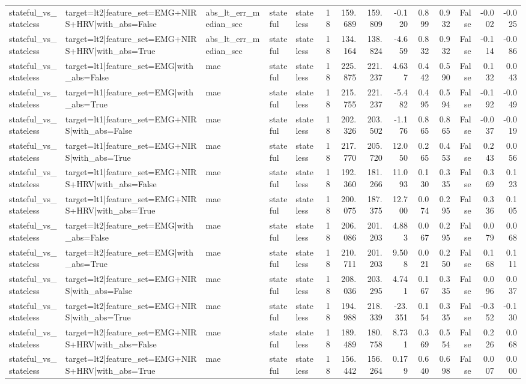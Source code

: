 \begin{table}
\begin{tabular}{lllllrrrrrrrrr}
stateful_vs_stateless & target=lt2|feature_set=EMG+NIRS+HRV|with_abs=False & abs_lt_err_median_sec & stateful & stateless & 18 & 159.689 & 159.809 & -0.120 & 0.899 & 0.932 & False & -0.002 & -0.025 \\
stateful_vs_stateless & target=lt2|feature_set=EMG+NIRS+HRV|with_abs=True & abs_lt_err_median_sec & stateful & stateless & 18 & 134.164 & 138.824 & -4.659 & 0.832 & 0.932 & False & -0.114 & -0.086 \\
stateful_vs_stateless & target=lt1|feature_set=EMG|with_abs=False & mae & stateful & stateless & 18 & 225.875 & 221.237 & 4.637 & 0.442 & 0.590 & False & 0.132 & 0.043 \\
stateful_vs_stateless & target=lt1|feature_set=EMG|with_abs=True & mae & stateful & stateless & 18 & 215.755 & 221.237 & -5.482 & 0.495 & 0.594 & False & -0.192 & -0.049 \\
stateful_vs_stateless & target=lt1|feature_set=EMG+NIRS|with_abs=False & mae & stateful & stateless & 18 & 202.326 & 203.502 & -1.176 & 0.865 & 0.865 & False & -0.037 & -0.019 \\
stateful_vs_stateless & target=lt1|feature_set=EMG+NIRS|with_abs=True & mae & stateful & stateless & 18 & 217.770 & 205.720 & 12.050 & 0.265 & 0.453 & False & 0.243 & 0.056 \\
stateful_vs_stateless & target=lt1|feature_set=EMG+NIRS+HRV|with_abs=False & mae & stateful & stateless & 18 & 192.360 & 181.266 & 11.093 & 0.130 & 0.335 & False & 0.369 & 0.123 \\
stateful_vs_stateless & target=lt1|feature_set=EMG+NIRS+HRV|with_abs=True & mae & stateful & stateless & 18 & 200.075 & 187.375 & 12.700 & 0.074 & 0.295 & False & 0.336 & 0.105 \\
stateful_vs_stateless & target=lt2|feature_set=EMG|with_abs=False & mae & stateful & stateless & 18 & 206.086 & 201.203 & 4.883 & 0.067 & 0.295 & False & 0.079 & 0.068 \\
stateful_vs_stateless & target=lt2|feature_set=EMG|with_abs=True & mae & stateful & stateless & 18 & 210.711 & 201.203 & 9.508 & 0.021 & 0.250 & False & 0.168 & 0.111 \\
stateful_vs_stateless & target=lt2|feature_set=EMG+NIRS|with_abs=False & mae & stateful & stateless & 18 & 208.036 & 203.295 & 4.741 & 0.167 & 0.335 & False & 0.096 & 0.037 \\
stateful_vs_stateless & target=lt2|feature_set=EMG+NIRS|with_abs=True & mae & stateful & stateless & 18 & 194.988 & 218.339 & -23.351 & 0.154 & 0.335 & False & -0.352 & -0.130 \\
stateful_vs_stateless & target=lt2|feature_set=EMG+NIRS+HRV|with_abs=False & mae & stateful & stateless & 18 & 189.489 & 180.758 & 8.731 & 0.369 & 0.554 & False & 0.226 & 0.068 \\
stateful_vs_stateless & target=lt2|feature_set=EMG+NIRS+HRV|with_abs=True & mae & stateful & stateless & 18 & 156.442 & 156.264 & 0.179 & 0.640 & 0.698 & False & 0.007 & 0.000 \\
\bottomrule
\end{tabular}
\end{table}
